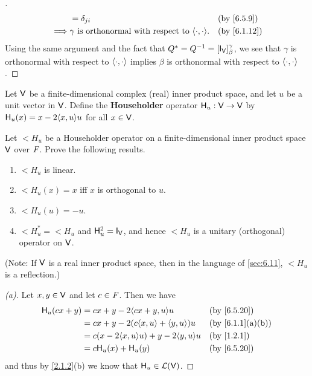\begin{proof}[]
\begin{align*}
             & = \delta_{j i}                                                                                                        &  & \by{6.5.9}  \\
    \implies & \gamma \text{ is orthonormal with respect to } \inn{\cdot, \cdot}.                                                    &  & \by{6.1.12}
  \end{align*}
  Using the same argument and the fact that \(Q^* = Q^{-1} = [\IT[\V]]_{\beta}^{\gamma}\), we see that \(\gamma\) is orthonormal with respect to \(\left\langle\cdot, \cdot\right\rangle\) implies \(\beta\) is orthonormal with respect to \(\left\langle\cdot, \cdot\right\rangle\).
\end{proof}

\begin{defn}\label{6.5.20}
  Let \(\mathsf{V}\) be a finite-dimensional complex (real) inner product space, and let \(u\) be a unit vector in \(\mathsf{V}\).
  Define the \textbf{Householder} operator \(\mathsf{H}_u : \mathsf{V} \to \mathsf{V}\) by \(\lt{H}_u(x) = x - 2 \inn{x, u} u\) for all \(x \in \mathsf{V}\).
\end{defn}

\begin{ex}\label{ex:6.5.31}
  Let \(\lt{H}_u\) be a Householder operator on a finite-dimensional inner product space \(\mathsf{V}\) over \(\mathit{F}\).
  Prove the following results.
  \begin{enumerate}
    \item \(\lt{H}_u\) is linear.
    \item \(\lt{H}_u(x) = x\) iff \(x\) is orthogonal to \(u\).
    \item \(\lt{H}_u(u) = -u\).
    \item \(\lt{H}_u^* = \lt{H}_u\) and \(\lt{H}_u^2 = \IT[\V]\), and hence \(\lt{H}_u\) is a unitary (orthogonal) operator on \(\mathsf{V}\).
  \end{enumerate}
  (Note:
  If \(\mathsf{V}\) is a real inner product space, then in the language of \cref{sec:6.11}, \(\lt{H}_u\) is a reflection.)
\end{ex}

\begin{proof}[(a)]
  Let \(x, y \in \mathsf{V}\) and let \(c \in \mathit{F}\).
  Then we have
  \begin{align*}
    \lt{H}_u(cx + y) & = cx + y - 2 \inn{cx + y, u} u                &  & \by{6.5.20}     \\
                     & = cx + y - 2 (c \inn{x, u} + \inn{y, u}) u    &  & \by{6.1.1}[a,b] \\
                     & = c (x - 2 \inn{x, u} u) + y - 2 \inn{y, u} u &  & \by{1.2.1}      \\
                     & = c \lt{H}_u(x) + \lt{H}_u(y)                 &  & \by{6.5.20}
  \end{align*}
  and thus by \cref{2.1.2}(b) we know that \(\mathsf{H}_u \in \mathcal{L}(\mathsf{V})\).
\end{proof}

